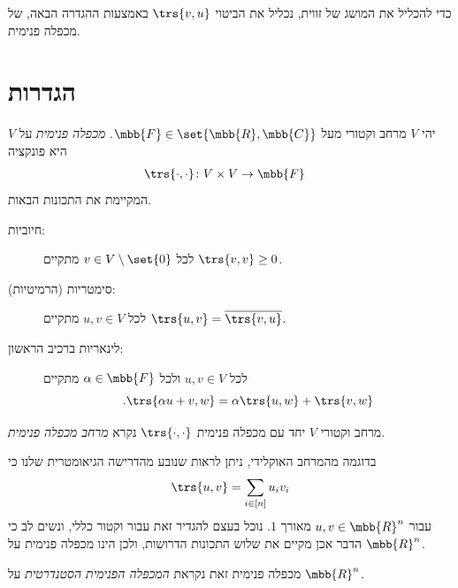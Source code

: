 \documentclass[a4paper,10pt,twoside,openany]{book}
\begin{document}
כדי להכליל את המושג של זווית, נכליל את הביטוי
$\trs{v,u}$
באמצעות ההגדרה הבאה, של מכפלה פנימית.

\section{הגדרות}

\begin{definition}
יהי
$V$
מרחב וקטורי מעל
$\mbb{F} \in \set{\mbb{R}, \mbb{C}}$.
\emph{מכפלה פנימית}
על
$V$
היא פונקציה
\begin{align*}
\trs{\cdot,\cdot} \colon V \times V &\to \mbb{F}
\end{align*}
המקיימת את התכונות הבאות.
\begin{description}
\item[חיוביות:]
לכל
$v \in V \setminus \set{0}$
מתקיים
$\trs{v,v} \geq 0$.

\item[סימטריות (הרמיטיות):]
לכל
$u,v \in V$
מתקיים
$\trs{u,v} = \overline{\trs{v,u}}$.

\item[לינאריות ברכיב הראשון:]
לכל
$u,v \in V$
ולכל
$\alpha \in \mbb{F}$
מתקיים
\[\text{.}\trs{\alpha u + v, w} = \alpha\trs{u,w} + \trs{v,w}\]
\end{description}

מרחב וקטורי
$V$
יחד עם מכפלה פנימית
$\trs{\cdot,\cdot}$
נקרא
\emph{מרחב מכפלה פנימית}.
\end{definition}

\begin{remark}
בדוגמה מהמרחב האוקלידי, ניתן לראות שנובע מהדרישה הגיאומטרית שלנו כי
\[\trs{u,v} = \sum_{i \in [n]} u_i v_i\]
עבור
$u,v \in \mbb{R}^n$
מאורך
$1$.
נוכל בעצם להגדיר זאת עבור וקטור כללי, ונשים לב כי הדבר אכן מקיים את שלוש התכונות הדרושות, ולכן הינו מכפלה פנימית על
$\mbb{R}^n$.

מכפלה פנימית זאת נקראת
\emph{המכפלה הפנימית הסטנדרטית}
על
$\mbb{R}^n$.
\end{remark}
\end{document}
